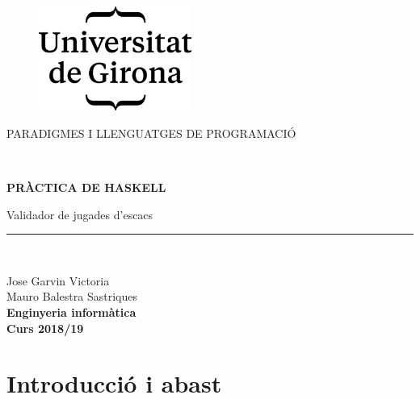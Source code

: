 \documentclass[12pt]{article}
\begin{document}
\begin{titlepage}

\begin{center}
\vspace*{1in}
\begin{figure}[htb]
\begin{center}
\includegraphics[width=5cm]{logo}
\end{center}
\end{figure}

PARADIGMES I LLENGUATGES DE PROGRAMACIÓ
\vspace*{0.15in}
\vspace*{0.6in}
\begin{large}
\\
\end{large}
\vspace*{0.2in}
\begin{Large}
\textbf{PRÀCTICA DE HASKELL} \\
\end{Large}
\vspace*{0.2in}
\begin{large}
Validador de jugades d'escacs\\
\end{large}
\vspace*{0.2in}
\rule{80mm}{0.1mm}\\
\vspace*{0.2in}
\begin{large}
Jose Garvin Victoria \\
Mauro Balestra Sastriques \\
\vspace*{0.2in}
 \textbf{Enginyeria informàtica}\\
 \vspace*{0.2in}
 \textbf{Curs 2018/19}
\end{large}
\end{center}

\end{titlepage}



\newpage
\tableofcontents

\newpage
\section{Introducció i abast}	
\end{document}
